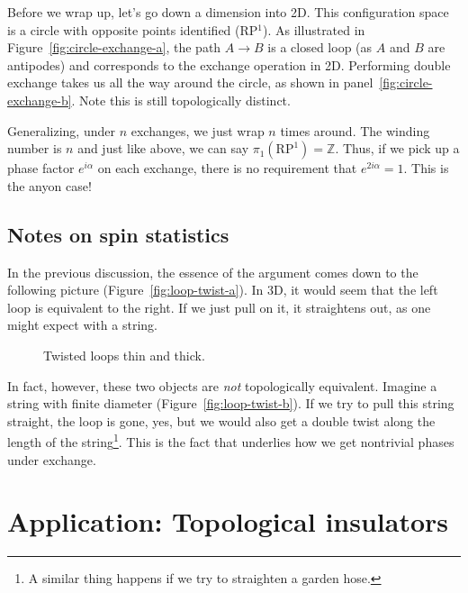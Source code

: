 \documentclass[12pt, english]{book}
\begin{document}
Before we wrap up, let's go down a dimension into 2D.
This configuration space is a circle with opposite points identified (RP$^1$).
As illustrated in Figure~\ref{fig:circle-exchange-a}, the path $A \rightarrow B$ is a closed loop (as $A$ and $B$ are antipodes) and corresponds to the exchange operation in 2D.
Performing double exchange takes us all the way around the circle, as shown in panel~\ref{fig:circle-exchange-b}.
Note this is still topologically distinct.

Generalizing, under $n$ exchanges, we just wrap $n$ times around.
The winding number is $n$ and just like above, we can say $\pi_1 (\mathrm{RP}^1) = \mathbb{Z}$.
Thus, if we pick up a phase factor $e^{i\alpha}$ on each exchange, there is no requirement that $e^{2i \alpha} = 1$.
This is the anyon case!


\subsection{Notes on spin statistics}

In the previous discussion, the essence of the argument comes down to the following picture (Figure~\ref{fig:loop-twist-a}).
In 3D, it would seem that the left loop is equivalent to the right.
If we just pull on it, it straightens out, as one might expect with a string.

\begin{figure}[!ht]
	\centering 
	\caption{Twisted loops thin and thick.}
	\label{fig:loop-twist}
\end{figure}

In fact, however, these two objects are \emph{not} topologically equivalent.
Imagine a string with finite diameter (Figure~\ref{fig:loop-twist-b}).
If we try to pull this string straight, the loop is gone, yes, but we would also get a double twist along the length of the string\footnote{A similar thing happens if we try to straighten a garden hose.}.
This is the fact that underlies how we get nontrivial phases under exchange.




\section{Application: Topological insulators}
\end{document}
